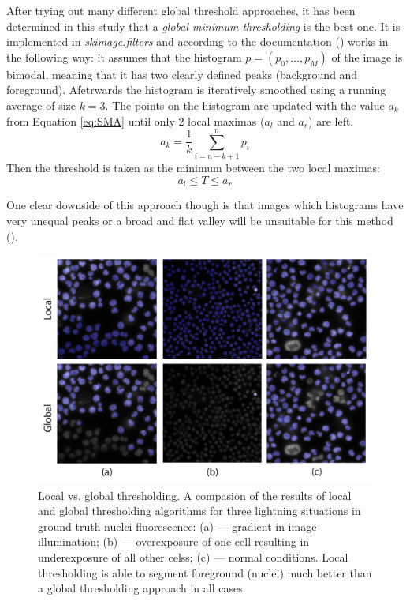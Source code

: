 After trying out many different global threshold approaches, it has been determined in this study that a \textit{global minimum thresholding} is the best one. It is implemented in \textit{skimage.filters} and according to the documentation (\cite{global_thresh}) works in the following way: it assumes that the histogram $p = (p_0, \ldots, p_{M})$ of the image is bimodal, meaning that it has two clearly defined peaks (background and foreground). Afetrwards the histogram is iteratively smoothed using a running average of size $k=3$. The points on the histogram are updated with the value $a_k$ from Equation \ref{eq:SMA} until only 2 local maximas ($a_l$ and $a_r$) are left. 
\begin{equation}
    a_k = \frac{1}{k}\sum_{i=n-k + 1}^{n}p_i
\label{eq:SMA}
\end{equation}
Then the threshold is taken as the minimum between the two local maximas:
\begin{equation}
    a_l \leq T \leq a_r
\end{equation}

One clear downside of this approach though is that images which histograms have very unequal peaks or a broad and flat valley will be unsuitable for this method (\cite{thresholding_skimage}).

\begin{figure}[htb]
	\begin{center}
		\includegraphics[width=0.6\linewidth]{bilder/difficult-lightning/local-vs-global.png}
		\caption[Local vs. global thresholding]%
        {Local vs. global thresholding. A compasion of the results of local and global thresholding algorithms for three lightning situations in ground truth nuclei fluorescence: (a) --- gradient in image illumination; (b) --- overexposure of one cell resulting in underexposure of all other celss; (c) --- normal conditions. Local thresholding is able to segment foreground (nuclei) much better than a global thresholding approach in all cases.}\label{fig:thresholding-bad-conditions}
	\end{center}
\end{figure}

